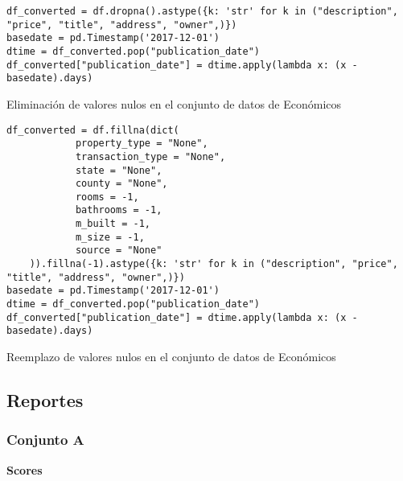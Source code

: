 \begin{listing}[H]
    \begin{verbatim}
df_converted = df.dropna().astype({k: 'str' for k in ("description", "price", "title", "address", "owner",)})
basedate = pd.Timestamp('2017-12-01')
dtime = df_converted.pop("publication_date")
df_converted["publication_date"] = dtime.apply(lambda x: (x - basedate).days)
    \end{verbatim}
\caption{Eliminación de valores nulos en el conjunto de datos de Económicos}
\label{codigo-remove-nan}
\end{listing}

\begin{listing}[H]
    \begin{verbatim}
df_converted = df.fillna(dict(
            property_type = "None",
            transaction_type = "None",
            state = "None",
            county = "None",
            rooms = -1,
            bathrooms = -1,
            m_built = -1,
            m_size = -1,
            source = "None"
    )).fillna(-1).astype({k: 'str' for k in ("description", "price", "title", "address", "owner",)})
basedate = pd.Timestamp('2017-12-01')
dtime = df_converted.pop("publication_date")
df_converted["publication_date"] = dtime.apply(lambda x: (x - basedate).days)
    \end{verbatim}
\caption{Reemplazo de valores nulos en el conjunto de datos de Económicos}
\label{codigo-replace-nan}
\end{listing}



\subsection{Reportes}
\subsubsection{Conjunto A}
\label{ds-conjunto-a}

\textbf{Scores}

